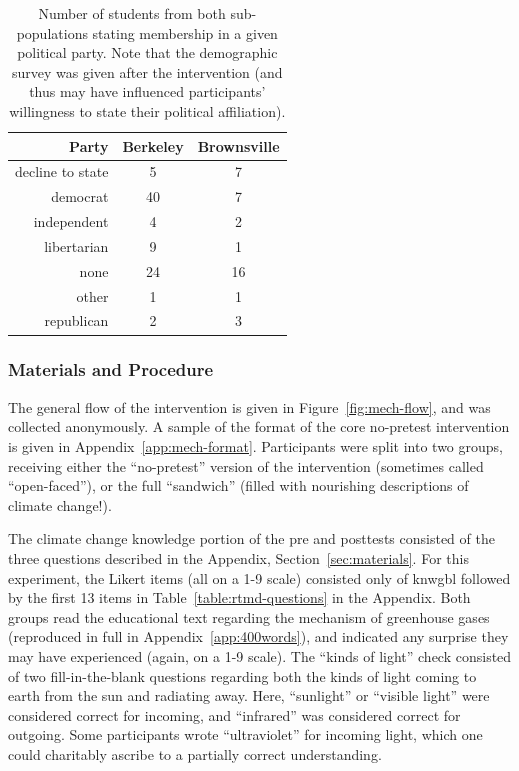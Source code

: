 \begin{table}
    \centering
    \caption{Number of students from both sub-populations stating membership in
        a given political party. Note that the demographic survey was given
        after the intervention (and thus may have influenced participants'
        willingness to state their political affiliation).}
    \label{table:study1-affiliation}
    \begin{tabular}{rcc}
        \toprule
        Party & Berkeley & Brownsville \\
        \midrule
          decline to state &   5  & 7 \\
          democrat &  40  & 7 \\
          independent &   4  & 2 \\
          libertarian &   9  & 1 \\
          none &  24   & 16 \\
          other &   1  & 1 \\
          republican &   2  & 3 \\
        \bottomrule
    \end{tabular}
\end{table}

\subsubsection{Materials and Procedure}

The general flow of the intervention is given in Figure~\ref{fig:mech-flow}, and
was collected anonymously.  A sample of the format of the core no-pretest
intervention is given in Appendix~\ref{app:mech-format}. Participants were split
into two groups, receiving either the “no-pretest” version of the intervention
(sometimes called “open-faced”), or the full “sandwich” (filled with nourishing
descriptions of climate change!). 

The climate change knowledge portion of the pre and posttests consisted of the
three questions described in the Appendix, Section~\ref{sec:materials}. For this
experiment, the Likert items (all on a 1-9 scale) consisted only of
\textsf{knwgbl} followed by the first 13 items in
Table~\ref{table:rtmd-questions} in the Appendix. Both groups read the
educational text regarding the mechanism of greenhouse gases (reproduced in
full in Appendix~\ref{app:400words}), and indicated any surprise they may have
experienced (again, on a 1-9 scale). The “kinds of light” check consisted of two
fill-in-the-blank questions regarding both the kinds of light coming to earth from
the sun and radiating away. Here, “sunlight” or “visible light” were considered
correct for incoming, and “infrared” was considered correct for outgoing.  Some
participants wrote “ultraviolet” for incoming light, which one could charitably
ascribe to a partially correct understanding.

